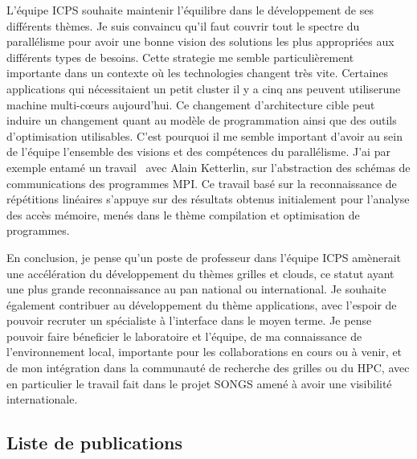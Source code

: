 \documentclass[11pt]{article}
\begin{document}
L'équipe  ICPS  souhaite maintenir  l'équilibre  dans  le développement  de  ses
différents  thèmes. Je  suis convaincu  qu'il faut  couvrir tout  le spectre  du
parallélisme pour avoir une bonne vision  des solutions les plus appropriées aux
différents  types  de  besoins.   Cette  strategie  me  semble  particulièrement
importante dans  un contexte où  les technologies changent très  vite. Certaines
applications  qui  nécessitaient un  petit  cluster  il  y  a cinq  ans  peuvent
utiliserune  machine multi-c{\oe}urs  aujourd'hui. Ce  changement d'architecture
cible peut induire un changement quant  au modèle de programmation ainsi que des
outils d'optimisation utilisables. C'est pourquoi il me semble important d'avoir
au   sein  de   l'équipe  l'ensemble   des   visions  et   des  compétences   du
parallélisme. J'ai  par exemple entamé un  travail~\cite{ketterlin11} avec Alain
Ketterlin,  sur  l'abstraction  des  schémas de  communications  des  programmes
MPI. Ce travail basé sur la reconnaissance de répétitions linéaires s'appuye sur
des résultats obtenus initialement pour  l'analyse des accès mémoire, menés dans
le thème compilation et optimisation de programmes.

En conclusion, je  pense qu'un poste de professeur dans  l'équipe ICPS amènerait
une accélération du  développement du thèmes grilles et clouds,  ce statut ayant
une plus  grande reconnaissance au  pan national ou international.   Je souhaite
également contribuer  au développement du  thème applications, avec  l'espoir de
pouvoir recruter  un spécialiste  à l'interface  dans le  moyen terme.  Je pense
pouvoir  faire béneficier  le laboratoire  et  l'équipe, de  ma connaissance  de
l'environnement local, importante  pour les collaborations en cours  ou à venir,
et de  mon intégration dans  la communauté de recherche  des grilles ou  du HPC,
avec en  particulier le  travail fait  dans le  projet SONGS  amené à  avoir une
visibilité internationale.


\subsectionfont{\sectionrule{3ex}{0pt}{-1ex}{0pt}}



\newpage
\subsection{Liste de publications}
\end{document}
